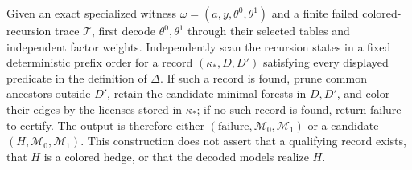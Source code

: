 Given an exact specialized witness \(\omega=(a,y,\theta^0,\theta^1)\) and a finite failed colored-recursion trace \(\mathcal T\), first decode \(\theta^0,\theta^1\) through their selected tables and independent factor weights. Independently scan the recursion states in a fixed deterministic prefix order for a record \((\kappa_*,D,D')\) satisfying every displayed predicate in the definition of \(\Delta\). If such a record is found, prune common ancestors outside \(D'\), retain the candidate minimal forests in \(D,D'\), and color their edges by the licenses stored in \(\kappa_*\); if no such record is found, return failure to certify. The output is therefore either \((\mathrm{failure},\mathcal M_0,\mathcal M_1)\) or a candidate \((H,\mathcal M_0,\mathcal M_1)\). This construction does not assert that a qualifying record exists, that \(H\) is a colored hedge, or that the decoded models realize \(H\).
